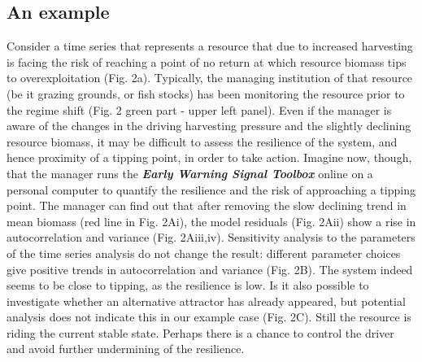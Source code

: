 \documentclass[12pt,a4paper,final]{article}
\begin{document}
\subsection{An example}
Consider a time series that represents a resource that due to increased harvesting is facing the risk of reaching a point of no return at which resource biomass tips to overexploitation (Fig. 2a). Typically, the managing institution of that resource (be it grazing grounds, or fish stocks) has been monitoring the resource prior to the regime shift (Fig. 2 green part - upper left panel). Even if the manager is aware of the changes in the driving harvesting pressure and the slightly declining resource biomass, it may be difficult to assess the resilience of the system, and hence proximity of a tipping point, in order to take action. Imagine now, though, that the manager runs the \textbf{\textit{Early Warning Signal Toolbox}} online on a personal computer to quantify the resilience and the risk of approaching a tipping point. The manager can find out that after removing the slow declining trend in mean biomass (red line in Fig. 2Ai), the model residuals (Fig. 2Aii) show a rise in autocorrelation and variance (Fig. 2Aiii,iv). Sensitivity analysis to the parameters of the time series analysis do not change the result: different parameter choices give positive trends in autocorrelation and variance (Fig. 2B). The system indeed seems to be close to tipping, as the resilience is low. Is it also possible to investigate whether an alternative attractor has already appeared, but potential analysis does not indicate this in our example case (Fig. 2C). Still the resource is riding the current stable state. Perhaps there is a chance to control the driver and avoid further undermining of the resilience. 

\end{document}

